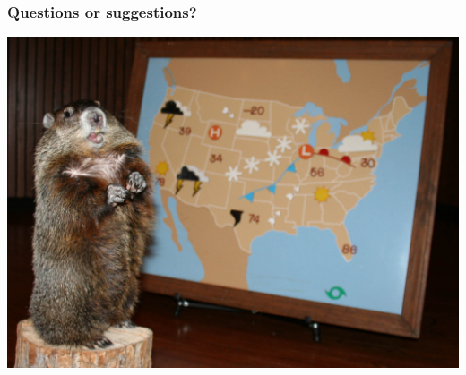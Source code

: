 \documentclass[pdf]{beamer}
\begin{document}
\begin{frame}
\frametitle{Questions or suggestions?}
{\includegraphics[width=1\textwidth]{figs/animal-weatherman.jpg}}
\end{frame}
\end{document}
